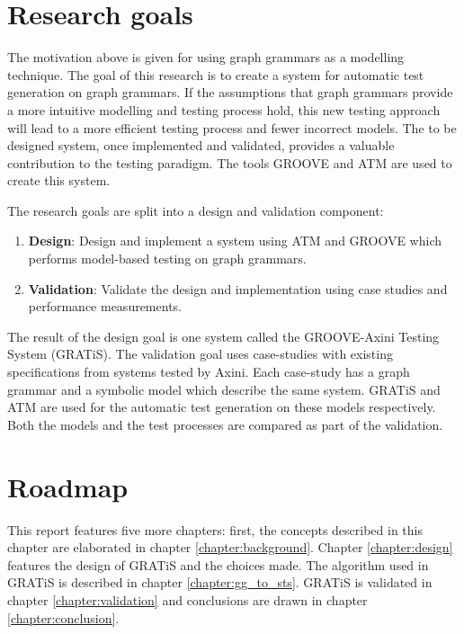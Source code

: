 \section{Research goals}\label{sec:goals}

The motivation above is given for using graph grammars as a modelling technique. The goal of this research is to create a system for automatic test generation on graph grammars. If the assumptions that graph grammars provide a more intuitive modelling and testing process hold, this new testing approach will lead to a more efficient testing process and fewer incorrect models. The to be designed system, once implemented and validated, provides a valuable contribution to the testing paradigm. The tools GROOVE and ATM are used to create this system.

The research goals are split into a design and validation component:
\begin{enumerate}
    \item \textbf{Design}: Design and implement a system using ATM and GROOVE which performs model-based testing on graph grammars.
    \item \textbf{Validation}: Validate the design and implementation using case studies and performance measurements.
\end{enumerate}

The result of the design goal is one system called the GROOVE-Axini Testing System (GRATiS). The validation goal uses case-studies with existing specifications from systems tested by Axini. Each case-study has a graph grammar and a symbolic model which describe the same system. GRATiS and ATM are used for the automatic test generation on these models respectively. Both the models and the test processes are compared as part of the validation.

\section{Roadmap}

This report features five more chapters: first, the concepts described in this chapter are elaborated in chapter \ref{chapter:background}. Chapter \ref{chapter:design} features the design of GRATiS and the choices made. The algorithm used in GRATiS is described in chapter \ref{chapter:gg_to_sts}. GRATiS is validated in chapter \ref{chapter:validation} and conclusions are drawn in chapter \ref{chapter:conclusion}.
